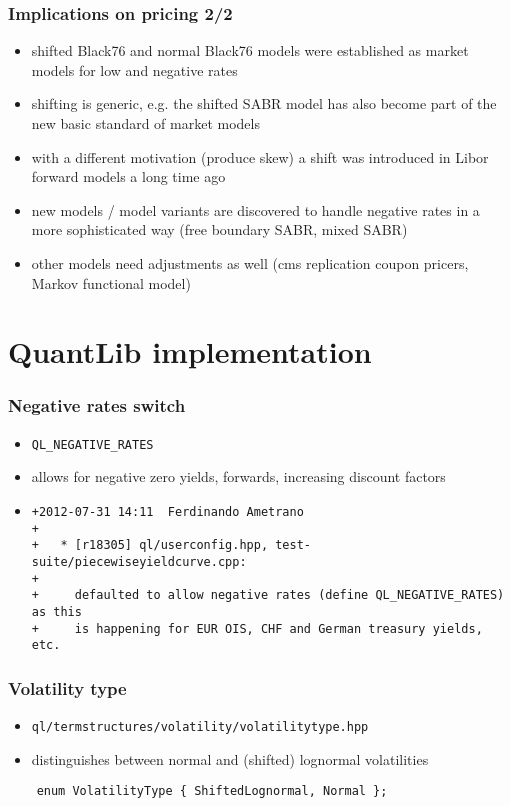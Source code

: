 \documentclass[10pt,German]{beamer}
\begin{document}
\begin{frame}[fragile]
\frametitle{Implications on pricing 2/2}
\begin{itemize}
\item shifted Black76 and normal Black76 models were established as market models for low and negative rates
\item shifting is generic, e.g. the shifted SABR model has also become part of the new basic standard of market models
\item with a different motivation (produce skew) a shift was introduced in Libor forward models a long time ago
\item new models / model variants are discovered to handle negative rates in a more sophisticated way (free boundary SABR, mixed SABR)
\item other models need adjustments as well (cms replication coupon pricers, Markov functional model)
\end{itemize}
\end{frame}

\section{QuantLib implementation}

\begin{frame}[fragile]
\frametitle{Negative rates switch}
\begin{itemize}
\item \verb+QL_NEGATIVE_RATES+
\item allows for negative zero yields, forwards, increasing discount factors
\item \tiny \begin{verbatim}
+2012-07-31 14:11  Ferdinando Ametrano
+
+	* [r18305] ql/userconfig.hpp, test-suite/piecewiseyieldcurve.cpp:
+
+     defaulted to allow negative rates (define QL_NEGATIVE_RATES) as this
+     is happening for EUR OIS, CHF and German treasury yields, etc.
\end{verbatim}
\end{itemize}
\end{frame}


\begin{frame}[fragile]
\frametitle{Volatility type}
\begin{itemize}
\item \footnotesize\verb+ql/termstructures/volatility/volatilitytype.hpp+
\item distinguishes between normal and (shifted) lognormal volatilities
\end{itemize}
\begin{verbatim}
    enum VolatilityType { ShiftedLognormal, Normal };
\end{verbatim}
\end{frame}
\end{document}
